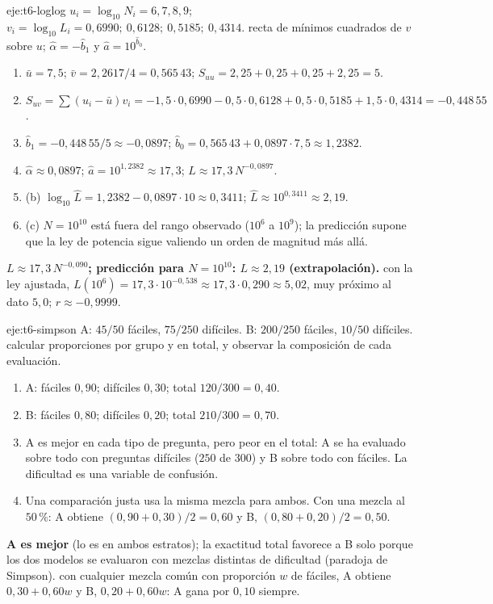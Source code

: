 \begin{solucion}{eje:t6-loglog}
\datos $u_i=\log_{10}N_i=6,7,8,9$; $v_i=\log_{10}L_i=0{,}6990;\allowbreak\ 0{,}6128;\allowbreak\ 0{,}5185;\allowbreak\ 0{,}4314$.
\planteamiento recta de mínimos cuadrados de $v$ sobre $u$; $\widehat\alpha=-\widehat b_1$ y $\widehat a=10^{\widehat b_0}$.
\pasos
\begin{enumerate}[label=\arabic*.]
  \item $\bar u=7{,}5$; $\bar v=2{,}2617/4=0{,}565\,43$; $S_{uu}=2{,}25+0{,}25+0{,}25+2{,}25=5$.
  \item $S_{uv}=\sum(u_i-\bar u)v_i=-1{,}5\cdot0{,}6990-0{,}5\cdot0{,}6128+0{,}5\cdot0{,}5185+1{,}5\cdot0{,}4314=-0{,}448\,55$.
  \item $\widehat b_1=-0{,}448\,55/5\approx-0{,}0897$; $\widehat b_0=0{,}565\,43+0{,}0897\cdot7{,}5\approx1{,}2382$.
  \item $\widehat\alpha\approx0{,}0897$; $\widehat a=10^{1{,}2382}\approx17{,}3$; $L\approx17{,}3\,N^{-0{,}0897}$.
  \item (b) $\log_{10}\widehat L=1{,}2382-0{,}0897\cdot10\approx0{,}3411$; $\widehat L\approx10^{0{,}3411}\approx2{,}19$.
  \item (c) $N=10^{10}$ está fuera del rango observado ($10^{6}$ a $10^{9}$); la predicción supone que la ley de potencia sigue valiendo un orden de magnitud más allá.
\end{enumerate}
\resultado \textbf{$L\approx17{,}3\,N^{-0{,}090}$; predicción para $N=10^{10}$: $L\approx2{,}19$ (extrapolación).}
\comprobacion con la ley ajustada, $L(10^{6})=17{,}3\cdot10^{-0{,}538}\approx17{,}3\cdot0{,}290\approx5{,}02$, muy próximo al dato $5{,}0$; $r\approx-0{,}9999$.
\end{solucion}

\begin{solucion}{eje:t6-simpson}
\datos A: $45/50$ fáciles, $75/250$ difíciles. B: $200/250$ fáciles, $10/50$ difíciles.
\planteamiento calcular proporciones por grupo y en total, y observar la composición de cada evaluación.
\pasos
\begin{enumerate}[label=\arabic*.]
  \item A: fáciles $0{,}90$; difíciles $0{,}30$; total $120/300=0{,}40$.
  \item B: fáciles $0{,}80$; difíciles $0{,}20$; total $210/300=0{,}70$.
  \item A es mejor en cada tipo de pregunta, pero peor en el total: A se ha evaluado sobre todo con preguntas difíciles ($250$ de $300$) y B sobre todo con fáciles. La dificultad es una variable de confusión.
  \item Una comparación justa usa la misma mezcla para ambos. Con una mezcla al $50\,\%$: A obtiene $(0{,}90+0{,}30)/2=0{,}60$ y B, $(0{,}80+0{,}20)/2=0{,}50$.
\end{enumerate}
\resultado \textbf{A es mejor} (lo es en ambos estratos); la exactitud total favorece a B solo porque los dos modelos se evaluaron con mezclas distintas de dificultad (paradoja de Simpson).
\comprobacion con cualquier mezcla común con proporción $w$ de fáciles, A obtiene $0{,}30+0{,}60w$ y B, $0{,}20+0{,}60w$: A gana por $0{,}10$ siempre.
\end{solucion}

